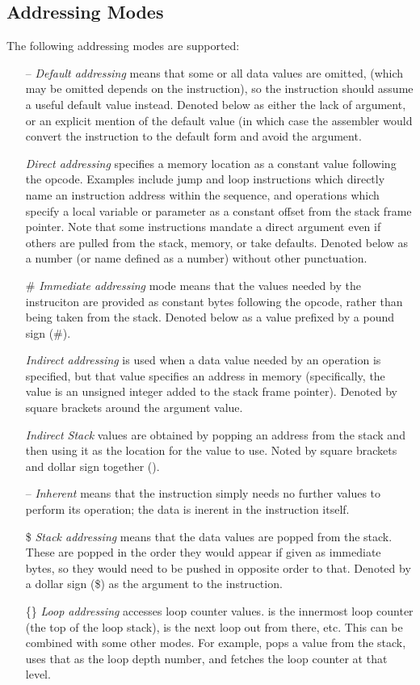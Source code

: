 \documentclass[letterpaper,twoside,onecolumn,openright,final]{memoir}
\begin{document}
{\subsection{Addressing Modes}
The following addressing modes are supported:
\begin{itemize}
	\item[--] \emph{Default addressing} means that some or all data values are omitted, 
		(which may be omitted depends on the instruction), so
		the instruction should assume
		a useful default value instead.  Denoted below as either the lack of argument, or
		an explicit mention of the default value (in which case the assembler would convert
		the instruction to the default form and avoid the argument.
	\item[\Var{a}] \emph{Direct addressing} specifies a memory location as a constant value following
		the opcode.  Examples include jump and loop instructions which directly name an
		instruction address within the sequence, and operations which specify a local
		variable or parameter as a constant offset from the stack frame pointer.  Note
		that some instructions mandate a direct argument even if others are pulled from
		the stack, memory, or take defaults.  Denoted below as a number (or name
		defined as a number) without other punctuation.
	\item[\z\#\Var{v}] \emph{Immediate addressing} mode means that the values needed by the instruciton are
		provided as constant bytes following the opcode, rather than being taken from the
		stack.  Denoted below as a value prefixed by a pound sign (\z\#).
	\item[{\z[\Var{a}\z]}] \emph{Indirect addressing} is used when a data value needed by an operation is
		specified, but that value specifies an address in memory (specifically, the value
		is an unsigned integer added to the stack frame pointer).  
		Denoted by square brackets around the argument value.
	\item[{\z{[\$]}}] \emph{Indirect Stack} values are obtained by popping an address from the stack and
		then using it as the location for the value to use.  Noted by square brackets
		and dollar sign together (\z{[\$]}).
	\item[--] \emph{Inherent} means that the instruction simply needs no further values to perform
		its operation; the data is inerent in the instruction itself.
	\item[\z\$] \emph{Stack addressing} means that the data values are popped from the stack.  These are
		popped in the order they would appear if given as immediate bytes, so they would
		need to be pushed in opposite order to that.  Denoted by a dollar sign (\z\$) as
		the argument to the instruction.
	\item[\z\{\Var{v}\z\}] \emph{Loop addressing} accesses loop counter values.   is the
		innermost loop counter (the top of the loop stack),  is the next loop out from
		there, etc.  This can be combined with some other modes.  For example, \z{\{\$\}}
		pops a value from the stack, uses that as the loop depth number, and fetches the
		loop counter at that level.
\end{itemize}

}
\end{document}
